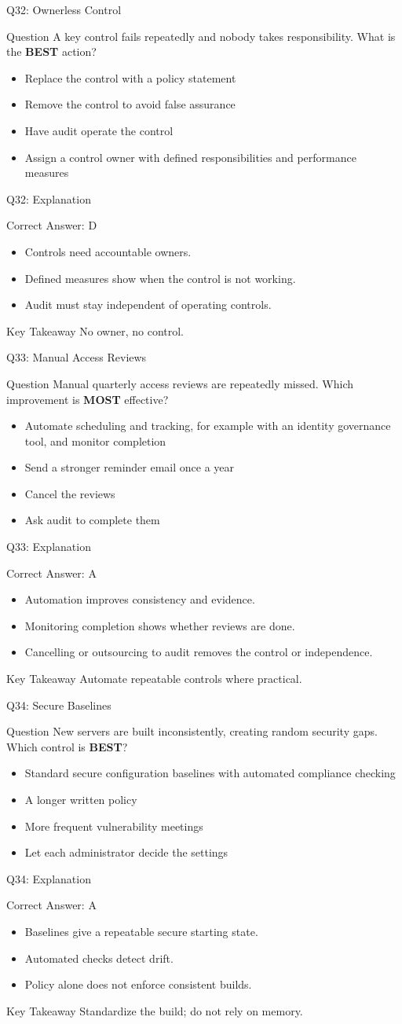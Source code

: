 \documentclass[aspectratio=169]{beamer}
\newcommand{\hq}[7]{%
	\begin{frame}{Q#1: #2}
		\begin{block}{Question}
			#3
		\end{block}
		\begin{itemize}
			#4
		\end{itemize}
	\end{frame}
	\begin{frame}{Q#1: Explanation}
		\begin{block}{Correct Answer: #5}
			\begin{itemize}
				#6
			\end{itemize}
		\end{block}
		\begin{alertblock}{Key Takeaway}
			#7
		\end{alertblock}
	\end{frame}
}
\begin{document}
	\hq{32}{Ownerless Control}
	{A key control fails repeatedly and nobody takes responsibility. What is the \textbf{BEST} action?}
	{\item[\textbf{(A)}] Replace the control with a policy statement
		\item[\textbf{(B)}] Remove the control to avoid false assurance
		\item[\textbf{(C)}] Have audit operate the control
		\item[\textbf{(D)}] Assign a control owner with defined responsibilities and performance measures}
	{D}
	{\item Controls need accountable owners.
		\item Defined measures show when the control is not working.
		\item Audit must stay independent of operating controls.}
	{No owner, no control.}
	
	\hq{33}{Manual Access Reviews}
	{Manual quarterly access reviews are repeatedly missed. Which improvement is \textbf{MOST} effective?}
	{\item[\textbf{(A)}] Automate scheduling and tracking, for example with an identity governance tool, and monitor completion
		\item[\textbf{(B)}] Send a stronger reminder email once a year
		\item[\textbf{(C)}] Cancel the reviews
		\item[\textbf{(D)}] Ask audit to complete them}
	{A}
	{\item Automation improves consistency and evidence.
		\item Monitoring completion shows whether reviews are done.
		\item Cancelling or outsourcing to audit removes the control or independence.}
	{Automate repeatable controls where practical.}
	
	\hq{34}{Secure Baselines}
	{New servers are built inconsistently, creating random security gaps. Which control is \textbf{BEST}?}
	{\item[\textbf{(A)}] Standard secure configuration baselines with automated compliance checking
		\item[\textbf{(B)}] A longer written policy
		\item[\textbf{(C)}] More frequent vulnerability meetings
		\item[\textbf{(D)}] Let each administrator decide the settings}
	{A}
	{\item Baselines give a repeatable secure starting state.
		\item Automated checks detect drift.
		\item Policy alone does not enforce consistent builds.}
	{Standardize the build; do not rely on memory.}
	
\end{document}
